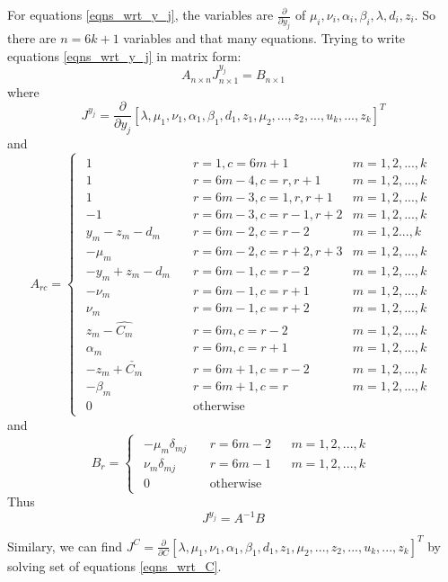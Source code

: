 \documentclass[11 pt]{article}
\begin{document}
For equations \ref{eqns_wrt_y_j}, the variables are $\frac{\partial}{\partial y_j}$ of $\mu_i,\nu_i,\alpha_i,\beta_i,\lambda,d_i,z_i$. So there are $n=6k + 1$ variables and that many equations.
Trying to write equations \ref{eqns_wrt_y_j} in matrix form:
\[A_{n \times n}J_{n \times 1}^{y_j} = B_{n \times 1}\]
where
\[J^{y_j} = \frac{\partial}{\partial y_j}[\lambda,\mu_1,\nu_1,\alpha_1,\beta_1,d_1,z_1,\mu_2,...,z_2,...,u_k,...,z_k]^T\]
and
\[
    A_{rc} =
    \begin{cases}
        \begin{aligned}
            1 &\quad  r=1,c=6m+1 & m=1,2,...,k \\
            1 &\quad  r=6m-4,c=r,r+1 & m=1,2,...,k \\
            1 &\quad  r=6m-3,c=1,r,r+1 & m=1,2,...,k \\
            -1 &\quad  r=6m-3,c=r-1,r+2 & m=1,2,...,k \\
            y_m-z_m-d_m &\quad  r=6m-2,c=r-2 & m=1,2...,k \\
            -\mu_m &\quad  r=6m-2,c=r+2,r+3 & m=1,2,...,k \\
            -y_m+z_m-d_m &\quad  r=6m-1,c=r-2 & m=1,2,...,k \\
            -\nu_m &\quad  r=6m-1,c=r+1 & m=1,2,...,k \\
            \nu_m &\quad  r=6m-1,c=r+2 & m=1,2,...,k \\
            z_m-\hat{C_m} &\quad  r=6m,c=r-2 & m=1,2,...,k \\
            \alpha_m &\quad  r=6m,c=r+1 & m=1,2,...,k \\
            -z_m+\check{C_m} &\quad  r=6m+1,c=r-2 & m=1,2,...,k \\
            -\beta_m &\quad  r=6m+1,c=r & m=1,2,...,k \\
            0 &\quad \text{otherwise}
        \end{aligned}
    \end{cases}
\]
and
\[
    B_{r} =
    \begin{cases}
        \begin{aligned}
            -\mu_m \delta_{mj}  &\quad r=6m-2 && m=1,2,...,k \\
            \nu_m \delta_{mj}   &\quad r=6m-1 && m=1,2,...,k \\
            0 &\quad \text{otherwise}
        \end{aligned}
    \end{cases}
\]
Thus \[J^{y_j} = A^{-1}B\]

Similary, we can find $J^C=\frac{\partial}{\partial C}[\lambda,\mu_1,\nu_1,\alpha_1,\beta_1,d_1,z_1,\mu_2,...,z_2,...,u_k,...,z_k]^T$ by solving set of equations \ref{eqns_wrt_C}.
\end{document}
